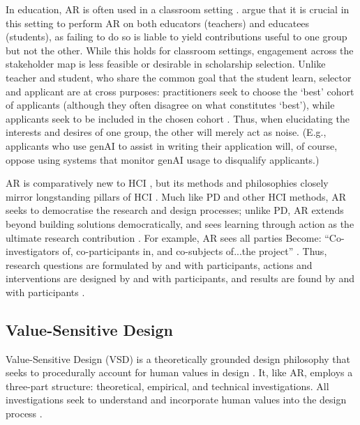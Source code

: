 In education, AR is often used in a classroom setting \cite{Mertler_2019}. \textcite{venn-wycherley_realities_2024} argue that it is crucial in this setting to perform AR on both educators (teachers) and educatees (students), as failing to do so is liable to yield contributions useful to one group but not the other. While this holds for classroom settings, engagement across the stakeholder map is less feasible or desirable in scholarship selection. Unlike teacher and student, who share the common goal that the student learn, selector and applicant are at cross purposes: practitioners seek to choose the `best' cohort of applicants (although they often disagree on what constitutes `best'), while applicants seek to be included in the chosen cohort \cite{bergman2021seven}. Thus, when elucidating the interests and desires of one group, the other will merely act as noise. (E.g., applicants who use genAI to assist in writing their application will, of course, oppose using systems that monitor genAI usage to disqualify applicants.)

AR is comparatively new to HCI \cite{Hayes_2011,lu_organizing_2023}, but its methods and philosophies closely mirror longstanding pillars of HCI \cite{Hayes_2011}. Much like PD and other HCI methods, AR seeks to democratise the research and design processes; unlike PD, AR extends beyond building solutions democratically, and sees learning through action as the ultimate research contribution \cite{Hayes_2011}. For example, AR sees all parties Become: ``Co-investigators of, co-participants in, and co-subjects of...the project'' \cite{Hayes_2011}.  Thus, research questions are formulated by and with participants, actions and interventions are designed by and with participants, and results are found by and with participants \cite{Hayes_2011}.

\subsection{Value-Sensitive Design}\label{ssec:value_sensitive_design}
Value-Sensitive Design (VSD) is a theoretically grounded design philosophy that seeks to procedurally account for human values in design \cite{batyavalue}. It, like AR, employs a three-part structure: theoretical, empirical, and technical investigations. All investigations seek to understand and incorporate human values into the design process \cite{10.1145/242485.242493}.

